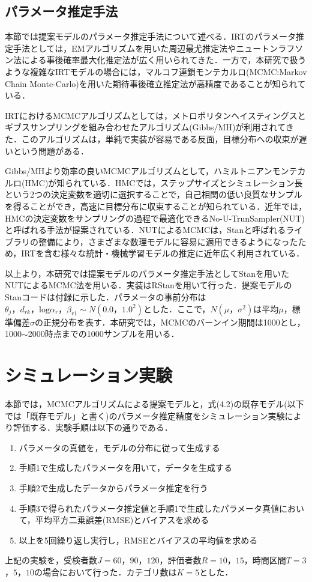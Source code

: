 \documentclass[a4paper,11pt,oneside,openany]{jsbook}
\begin{document}
\section{パラメータ推定手法}
本節では提案モデルのパラメータ推定手法について述べる．IRTのパラメータ推定手法としては，EMアルゴリズムを用いた周辺最尤推定法やニュートンラフソン法による事後確率最大化推定法が広く用いられてきた．一方で，本研究で扱うような複雑なIRTモデルの場合には，マルコフ連鎖モンテカルロ(MCMC:Markov Chain Monte-Carlo)を用いた期待事後確立推定法が高精度であることが知られている\cite{IRTUtoUeno,norm}．

IRTにおけるMCMCアルゴリズムとしては，メトロポリタンヘイスティングスとギブスサンプリングを組み合わせたアルゴリズム(Gibbs/MH)\cite{IRTUtoUeno,Patz,BiasUsami}が利用されてきた．このアルゴリズムは，単純で実装が容易である反面，目標分布への収束が遅いという問題がある\cite{Hoffman,Giroami}．

Gibbs/MHより効率の良いMCMCアルゴリズムとして，ハミルトニアンモンテカルロ(HMC)が知られている\cite{Rosenthal}．HMCでは，ステップサイズとシミュレーション長という2つの決定変数を適切に選択することで，自己相関の低い良質なサンプルを得ることができ，高速に目標分布に収束することが知られている\cite{Hoffman,Neal}．近年では，HMCの決定変数をサンプリングの過程で最適化できるNo-U-TrunSampler(NUT)\cite{Hoffman}と呼ばれる手法が提案されている．NUTによるMCMCは，Stan\cite{stan}と呼ばれるライブラリの整備により，さまざまな数理モデルに容易に適用できるようになったため，IRTを含む様々な統計・機械学習モデルの推定に近年広く利用されている\cite{Luo,Jiang,Matsura}．

以上より，本研究では提案モデルのパラメータ推定手法としてStanを用いたNUTによるMCMC法を用いる．実装はRStan\cite{rstan}を用いて行った．提案モデルのStanコードは付録に示した．パラメータの事前分布は$\theta_{j}，d_{rk}，\mathrm{log}\alpha_{r}，\beta_{r1}\sim N(0.0，1.0^{2})$とした．ここで，$N(\mu，\sigma^2)$は平均$\mu$，標準偏差$\sigma$の正規分布を表す．本研究では，MCMCのバーンイン期間は1000とし，1000$\sim$2000時点までの1000サンプルを用いる．

\newpage
\chapter{シミュレーション実験}

本節では，MCMCアルゴリズムによる提案モデルと，式(4.2)の既存モデル(以下では「既存モデル」と書く)のパラメータ推定精度をシミュレーション実験により評価する．実験手順は以下の通りである．
\begin{enumerate}
\item パラメータの真値を，モデルの分布に従って生成する
\item 手順1で生成したパラメータを用いて，データを生成する
\item 手順2で生成したデータからパラメータ推定を行う
\item 手順3で得られたパラメータ推定値と手順1で生成したパラメータ真値において，平均平方二乗誤差(RMSE)とバイアスを求める
\item 以上を5回繰り返し実行し，RMSEとバイアスの平均値を求める
\end{enumerate}
上記の実験を，受検者数$J=60$，$90$，$120$，評価者数$R=10$，$15$，時間区間$T=3$，$5$，$10$の場合において行った．カテゴリ数は$K=5$とした．
\end{document}
